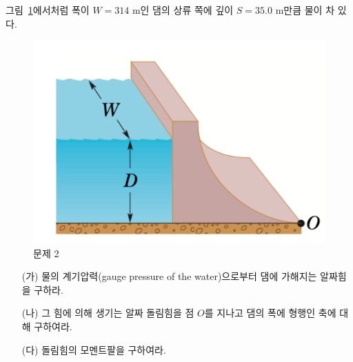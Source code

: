\documentclass[floatfix,nofootinbib,superscriptaddress,fleqn]{revtex4-2}
\begin{document}
그림~\ref{fig:1}에서처럼 폭이 $W=314$
m인 댐의 상류 쪽에 깊이 $S=35.0$ m만큼 물이 차 있다. 
\begin{figure}[htp]
  \centering
  \includegraphics[scale=0.65]{Qfig16-1.pdf}
    \caption{문제 2}
  \label{fig:1}
\end{figure}
\begin{itemize}
\item[(가)] 물의 계기압력(gauge pressure of the water)으로부터 댐에
  가해지는 알짜힘을 구하라.
\item[(나)] 그 힘에 의해 생기는 알짜 돌림힘을 점 $O$를 지나고 댐의
  폭에 형행인 축에 대해 구하여라.
\item[(다)] 돌림힘의 모멘트팔을 구하여라.   
\end{itemize}
\end{document}
